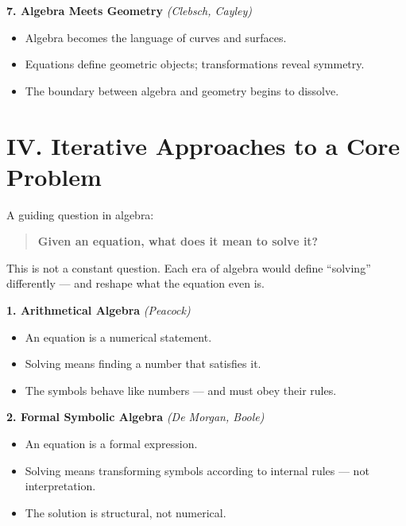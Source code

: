 \documentclass[9pt]{article}
\begin{document}
\textbf{7. Algebra Meets Geometry} \hfill \textit{(Clebsch, Cayley)}

\begin{itemize}
  \item Algebra becomes the language of curves and surfaces.
  \item Equations define geometric objects; transformations reveal symmetry.
  \item The boundary between algebra and geometry begins to dissolve.
\end{itemize}

\newpage

\section*{IV. Iterative Approaches to a Core Problem}

A guiding question in algebra:

\begin{quote}
\textbf{Given an equation, what does it mean to solve it?}
\end{quote}

\noindent
This is not a constant question.  
Each era of algebra would define “solving” differently — and reshape what the equation even is.

\bigskip

\textbf{1. Arithmetical Algebra} \hfill \textit{(Peacock)}

\begin{itemize}
  \item An equation is a numerical statement.
  \item Solving means finding a number that satisfies it.
  \item The symbols behave like numbers — and must obey their rules.
\end{itemize}

\bigskip

\textbf{2. Formal Symbolic Algebra} \hfill \textit{(De Morgan, Boole)}

\begin{itemize}
  \item An equation is a formal expression.
  \item Solving means transforming symbols according to internal rules — not interpretation.
  \item The solution is structural, not numerical.
\end{itemize}

\bigskip
\end{document}

